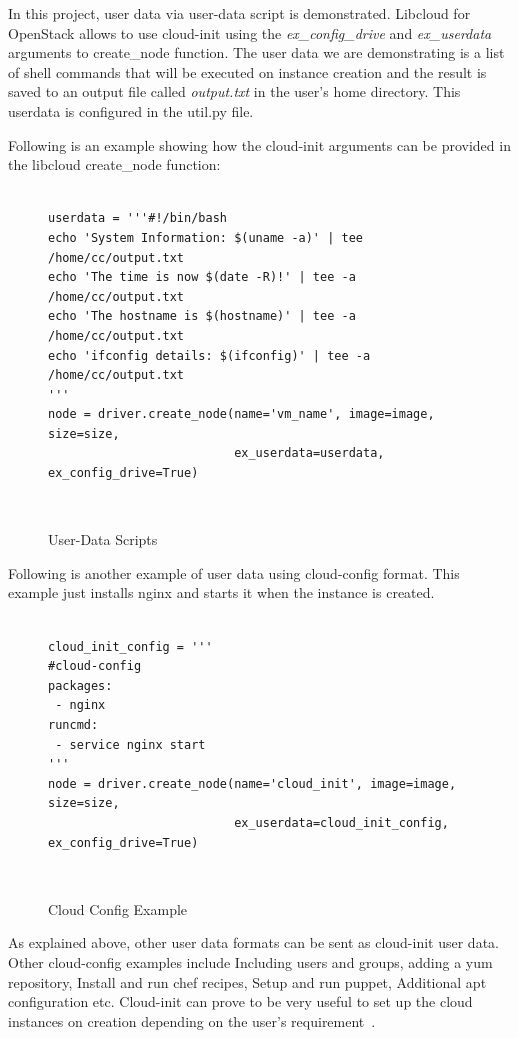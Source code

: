 In this project, user data via user-data script is demonstrated. Libcloud for
OpenStack allows to use cloud-init using the \textit{ex\_config\_drive} and
\textit{ex\_userdata} arguments to create\_node function. The user data we are
demonstrating is a list of shell commands that will be executed on instance
creation and the result is saved to an output file called \textit{output.txt} 
in the user's home directory. This userdata is configured in the util.py file.

Following is an example showing how the cloud-init arguments can be provided 
in the libcloud create\_node function:

\begin{figure}[htb]
\begin{verbatim}

userdata = '''#!/bin/bash
echo 'System Information: $(uname -a)' | tee /home/cc/output.txt
echo 'The time is now $(date -R)!' | tee -a /home/cc/output.txt
echo 'The hostname is $(hostname)' | tee -a /home/cc/output.txt
echo 'ifconfig details: $(ifconfig)' | tee -a /home/cc/output.txt
'''
node = driver.create_node(name='vm_name', image=image, size=size,
                          ex_userdata=userdata, ex_config_drive=True)
\end{verbatim}
\caption{User-Data Scripts}
~\cite{hid-sp18-516-www-cloud-init}\label{c:cloud-init-example1}
\end{figure}

Following is another example of user data using cloud-config format. This
example just installs nginx and starts it when the instance is created.

\begin{figure}[htb]
\begin{verbatim}

cloud_init_config = '''
#cloud-config
packages:
 - nginx
runcmd:
 - service nginx start
'''
node = driver.create_node(name='cloud_init', image=image, size=size,
                          ex_userdata=cloud_init_config, ex_config_drive=True)
\end{verbatim}
\caption{Cloud Config Example}
~\cite{hid-sp18-516-www-libcloud-functions}\label{c:cloud-init-example2}
\end{figure}

As explained above, other user data formats can be sent as cloud-init user 
data. Other cloud-config examples include Including users and groups, adding 
a yum repository, Install and run chef recipes, Setup and run puppet, 
Additional apt configuration etc. Cloud-init can prove to be very useful to 
set up the cloud instances on creation depending on the user's
requirement~\cite{hid-sp18-516-www-cloud-init}.

